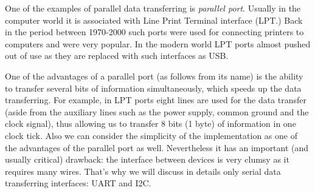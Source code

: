 \documentclass[../sparc.tex]{subfiles}
\begin{document}
One of the examples of parallel data transferring is \emph{parallel port}.
Usually in the computer world it is associated with Line Print Terminal
interface (\gls{LPT}.)  Back in the period between 1970-2000 such ports were
used for connecting printers to computers and were very popular.  In the modern
world LPT ports almost pushed out of use as they are replaced with such
interfaces as USB.

One of the advantages of a parallel port (as follows from its name) is the
ability to transfer several bits of information simultaneously, which speeds up
the data transferring.  For example, in LPT ports eight lines are used for the
data transfer (aside from the auxiliary lines such as the power supply, common
ground and the clock signal), thus allowing us to transfer 8 bits (1 byte) of
information in one clock tick.  Also we can consider the simplicity of the
implementation as one of the advantages of the parallel port as well.
Nevertheless it has an important (and usually critical) drawback: the interface
between devices is very clumsy as it requires many wires.  That's why we will
discuss in details only serial data transferring interfaces: \gls{UART} and I2C.

\end{document}
